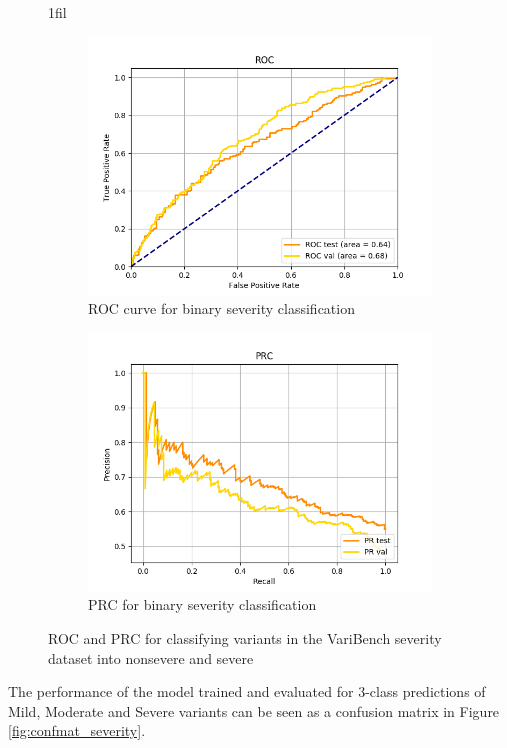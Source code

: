 \documentclass[11pt]{article}
\makeatletter
\newcommand*{\centerfloat}{%
  \parindent \z@
  \leftskip \z@ \@plus 1fil \@minus \textwidth
  \rightskip\leftskip
  \parfillskip \z@skip}
\makeatother
\begin{document}
\begin{figure}
\centerfloat
\begin{subfigure}{.8\textwidth}
  \centering
  \includegraphics[width=.9\linewidth]{ps_transfer_ROC.png}
  \caption{ROC curve for binary severity classification}
  \label{fig:sub1_s}
\end{subfigure}%
\begin{subfigure}{.8\textwidth}
  \centering
  \includegraphics[width=.9\linewidth]{ps_transfer_PRC.png}
  \caption{PRC for binary severity classification}
  \label{fig:sub2_s}
\end{subfigure}
\caption{ROC and PRC for classifying variants in the VariBench severity dataset into nonsevere and severe}
\label{fig:ps_binary}
\end{figure}

The performance of the model trained and evaluated for 3-class predictions of Mild, Moderate and Severe variants can be seen as a confusion matrix in Figure \ref{fig:confmat_severity}. 
\end{document}
